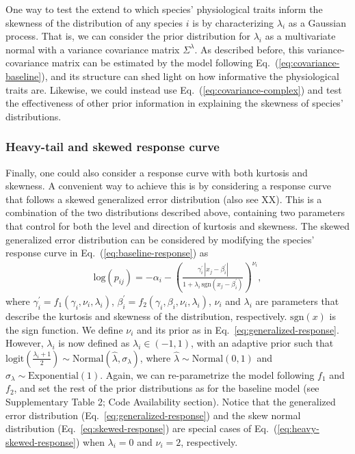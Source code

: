 \documentclass[11pt, a4paper]{article}
\begin{document}
One way to test the extend to which species' physiological traits inform the skewness of the distribution of any species $i$ is by characterizing $\lambda_{i}$ as a Gaussian process. That is, we can consider the prior distribution for $\lambda_{i}$ as a multivariate normal with a variance covariance matrix $\Sigma^{\lambda}$. As described before, this variance-covariance matrix can be estimated by the model following Eq.~(\ref{eq:covariance-baseline}), and its structure can shed light on how informative the physiological traits are. Likewise, we could instead use Eq.~(\ref{eq:covariance-complex}) and test the effectiveness of other prior information in explaining the skewness of species' distributions.

\subsubsection*{Heavy-tail and skewed response curve}
Finally, one could also consider a response curve with both kurtosis and skewness. A convenient way to achieve this is by considering a response curve that follows a skewed generalized error distribution (also see XX). This is a combination of the two distributions described above, containing two parameters that control for both the level and direction of kurtosis and skewness. The skewed generalized error distribution can be considered by modifying the species' response curve in Eq.~(\ref{eq:baseline-response}) as
\begin{equation}	
\begin{split}
\text{log}\left(p_{ij}\right) = -\alpha_{i} - \left(\frac{\gamma^{\prime}_{i}\,|x_{j}-\beta^{\prime}_{i}|}{1+\lambda_{i}\,\text{sgn}\left(x_{j}-\beta^{\prime}_{i}\right)}\right)^{\nu_{i}} ,
\end{split}
\label{eq:heavy-skewed-response}
\end{equation}
where $\gamma^{\prime}_{i} = f_{1}\left(\gamma_{i}, \nu_{i}, \lambda_{i}\right)$, $\beta^{\prime}_{i} = f_{2}\left(\gamma_{i}, \beta_{i}, \nu_{i}, \lambda_{i}\right)$, $\nu_{i}$ and $\lambda_i$ are parameters that describe the kurtosis and skewness of the distribution, respectively. $\text{sgn}\left(x\right)$ is the sign function. We define $\nu_i$ and its prior as in Eq.~\ref{eq:generalized-response}. However, $\lambda_i$ is now defined as $\lambda_{i}\in\left(-1, 1\right)$, with an adaptive prior such that $\text{logit}\left(\frac{\lambda_{i}+1}{2}\right)\sim \text{Normal}\left(\hat{\lambda}, \sigma_{\lambda}\right)$, where $\hat{\lambda}\sim\text{Normal}\left(0, 1\right)$ and $\sigma_{\lambda}\sim\text{Exponential}\left(1\right)$. Again, we can re-parametrize the model following $f_1$ and $f_2$, and set the rest of the prior distributions as for the baseline model (see Supplementary Table 2; Code Availability section). Notice that the generalized error distribution (Eq.~\ref{eq:generalized-response}) and the skew normal distribution (Eq.~\ref{eq:skewed-response}) are special cases of Eq.~(\ref{eq:heavy-skewed-response}) when $\lambda_i=0$ and $\nu_i=2$, respectively.
\end{document}
